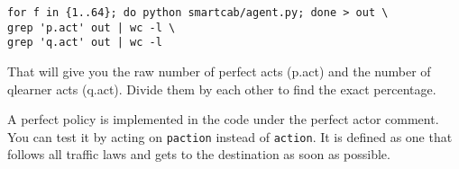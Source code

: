 \documentclass[11pt]{article}
\begin{document}
\begin{lstlisting}
for f in {1..64}; do python smartcab/agent.py; done > out \
grep 'p.act' out | wc -l \
grep 'q.act' out | wc -l
\end{lstlisting}

That will give you the raw number of perfect acts (p.act) and the number of qlearner acts (q.act). Divide them by each other to find the exact percentage.

A perfect policy is implemented in the code under the perfect actor comment. You can test it by acting on \texttt{paction} instead of \texttt{action}. It is defined as one that follows all traffic laws and gets to the destination as soon as possible.
\end{document}
